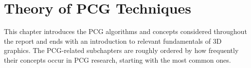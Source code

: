 \chapter{Theory of PCG Techniques}

This chapter introduces the PCG algorithms and concepts considered throughout the report and ends with an introduction to relevant fundamentals of 3D graphics.
The PCG-related subchapters are roughly ordered by how frequently their concepts occur in PCG research, starting with the most common ones.








